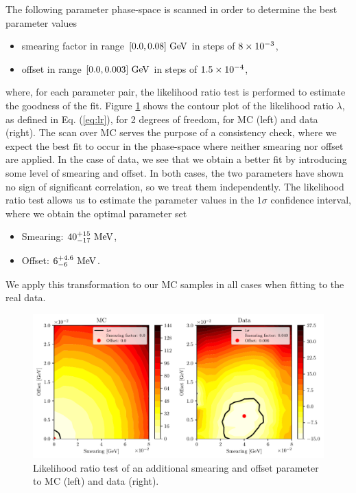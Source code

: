 The following parameter phase-space is scanned in order to determine the best parameter values
\begin{itemize}
	\item smearing factor in range $[0.0, 0.08]\mathrm{~GeV}$ in steps of $8\times 10^{-3}$,
	\item offset in range $[0.0, 0.003]\mathrm{~GeV}$ in steps of $1.5\times 10^{-4}$,
\end{itemize}
where, for each parameter pair, the likelihood ratio test is performed to estimate the goodness of the fit. Figure \ref{fig:smearing_offset} shows the contour plot of the likelihood ratio $\lambda$, as defined in Eq. (\ref{eq:lr}), for 2 degrees of freedom, for MC (left) and data (right). The scan over MC serves the purpose of a consistency check, where we expect the best fit to occur in the phase-space where neither smearing nor offset are applied. In the case of data, we see that we obtain a better fit by introducing some level of smearing and offset. In both cases, the two parameters have shown no sign of significant correlation, so we treat them independently. The likelihood ratio test allows us to estimate the parameter values in the $1\sigma$ confidence interval, where we obtain the optimal parameter set
\begin{itemize}
	\item Smearing: $40_{-17}^{+15}\mathrm{~MeV}$,
	\item Offset: $6_{-6}^{+4.6}\mathrm{~MeV}$.
\end{itemize}
We apply this transformation to our MC samples in all cases when fitting to the real data.

\begin{figure}[H]
	\centering
	\captionsetup{width=0.8\linewidth}
	\includegraphics[width=\linewidth]{fig/smearing_offset}
	\caption{Likelihood ratio test of an additional smearing and offset parameter to MC (left) and data (right).}
	\label{fig:smearing_offset}
\end{figure}


